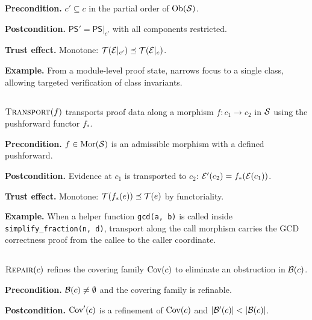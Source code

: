 \documentclass[11pt]{article}
\newcommand{\PS}{\mathsf{PS}}
\begin{document}
\noindent\textbf{Precondition.}
$c' \subseteq c$ in the partial order of $\mathrm{Ob}(\mathcal{S})$.

\noindent\textbf{Postcondition.}
$\PS' = \PS|_{c'}$ with all components restricted.

\noindent\textbf{Trust effect.}
Monotone: $\mathcal{T}(\mathcal{E}|_{c'}) \preceq \mathcal{T}(\mathcal{E}|_c)$.

\noindent\textbf{Example.}
From a module-level proof state, \RESTRICT{} narrows focus to
a single class, allowing targeted verification of class invariants.

\subsection{\TRANSPORT}\label{sec:move-transport}

\begin{definition}[\TRANSPORT]
$\textsc{Transport}(f)$ transports proof data along a morphism $f: c_1 \to c_2$
in $\mathcal{S}$ using the pushforward functor $f_*$.
\end{definition}

\noindent\textbf{Precondition.}
$f \in \mathrm{Mor}(\mathcal{S})$ is an admissible morphism with a defined pushforward.

\noindent\textbf{Postcondition.}
Evidence at $c_1$ is transported to $c_2$: $\mathcal{E}'(c_2) = f_*(\mathcal{E}(c_1))$.

\noindent\textbf{Trust effect.}
Monotone: $\mathcal{T}(f_*(e)) \preceq \mathcal{T}(e)$ by functoriality.

\noindent\textbf{Example.}
When a helper function \texttt{gcd(a, b)} is called inside
\texttt{simplify\_fraction(n, d)}, transport along the call morphism
carries the GCD correctness proof from the callee to the caller coordinate.

\subsection{\REPAIR}\label{sec:move-repair}

\begin{definition}[\REPAIR]
$\textsc{Repair}(c)$ refines the covering family $\mathrm{Cov}(c)$ to eliminate
an obstruction in $\mathcal{B}(c)$.
\end{definition}

\noindent\textbf{Precondition.}
$\mathcal{B}(c) \neq \emptyset$ and the covering family is refinable.

\noindent\textbf{Postcondition.}
$\mathrm{Cov}'(c)$ is a refinement of $\mathrm{Cov}(c)$ and
$|\mathcal{B}'(c)| < |\mathcal{B}(c)|$.
\end{document}
